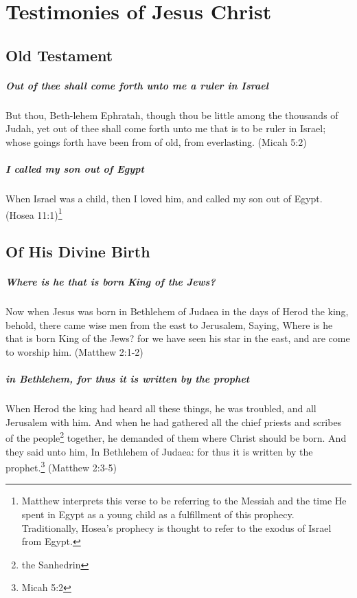 \chapter{Testimonies of Jesus Christ}

\section{Old Testament}

\paragraph{Out of thee shall come forth unto me a ruler in Israel}
But thou, Beth-lehem Ephratah, though thou be little among the thousands of Judah, yet out of thee shall come forth unto me that is to be ruler in Israel; whose goings forth have been from of old, from everlasting. (Micah 5:2)

\paragraph{I called my son out of Egypt}
When Israel was a child, then I loved him, and called my son out of Egypt. (Hosea 11:1)\footnote{Matthew interprets this verse to be referring to the Messiah and the time He spent in Egypt as a young child as a fulfillment of this prophecy. Traditionally, Hosea's prophecy is thought to refer to the exodus of Israel from Egypt.}

\section{Of His Divine Birth}

\paragraph{Where is he that is born King of the Jews?}
Now when Jesus was born in Bethlehem of Judaea in the days of Herod the king, behold, there came wise men from the east to Jerusalem, Saying, Where is he that is born King of the Jews? for we have seen his star in the east, and are come to worship him. (Matthew 2:1-2)

\paragraph{in Bethlehem, for thus it is written by the prophet}
When Herod the king had heard all these things, he was troubled, and all Jerusalem with him. And when he had gathered all the chief priests and scribes of the people\footnote{the Sanhedrin} together, he demanded of them where Christ should be born. And they said unto him, In Bethlehem of Judaea: for thus it is written by the prophet.\footnote{Micah 5:2} (Matthew 2:3-5)

